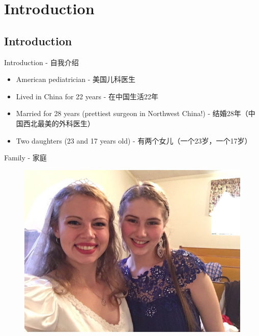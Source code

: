 \section{Introduction}\label{introduction}

\subsection{Introduction}\label{introduction-1}

\begin{frame}{Introduction - 自我介绍}

\begin{itemize}
\itemsep1pt\parskip0pt
\item
  American pediatrician - 美国儿科医生
\item
  Lived in China for 22 years - 在中国生活22年
\item
  Married for 28 years (prettiest surgeon in Northwest China!) -
  结婚28年（中国西北最美的外科医生）
\item
  Two daughters (23 and 17 years old) - 有两个女儿（一个23岁，一个17岁）
\end{itemize}

\end{frame}

\begin{frame}{Family - 家庭}

\begin{figure}
\includegraphics[scale=0.3]{./img/siblingsday.jpg}
\end{figure}

\end{frame}

